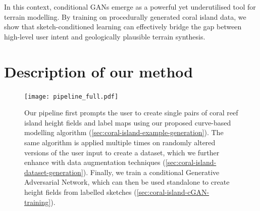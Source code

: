 In this context, conditional GANs emerge as a powerful yet underutilised tool for terrain modelling. By training on procedurally generated coral island data, we show that sketch-conditioned learning can effectively bridge the gap between high-level user intent and geologically plausible terrain synthesis.




\section{Description of our method}
\label{sec:coral-island-method-description}

\begin{figure}[H]
    \texttt{[image: pipeline\_full.pdf]}
    \caption{Our pipeline first prompts the user to create single pairs of coral reef island height fields and label maps using our proposed curve-based modelling algorithm (\cref{sec:coral-island-example-generation}). The same algorithm is applied multiple times on randomly altered versions of the user input to create a dataset, which we further enhance with data augmentation techniques (\cref{sec:coral-island-dataset-generation}). Finally, we train a conditional Generative Adversarial Network, which can then be used standalone to create height fields from labelled sketches (\cref{sec:coral-island-cGAN-training}).}
    \label{fig:coral-island-pipeline}
\end{figure}





